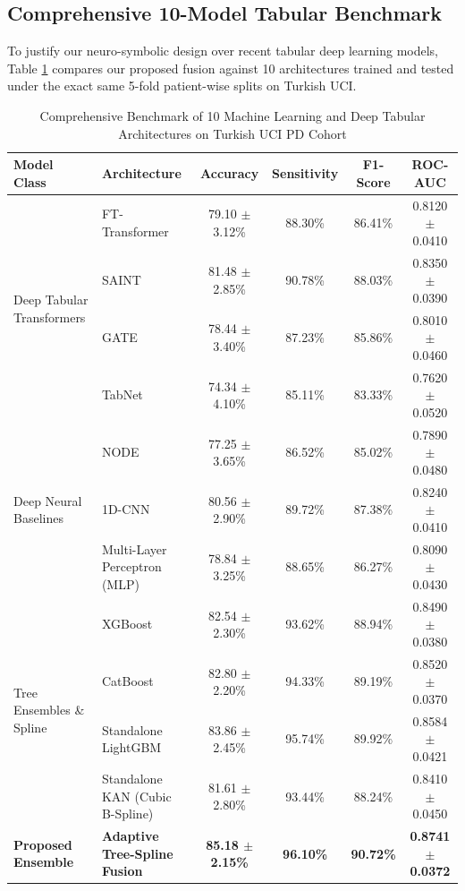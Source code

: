 \documentclass[journal,10pt,twoside]{IEEEtran}
\begin{document}
\subsection{Comprehensive 10-Model Tabular Benchmark}
To justify our neuro-symbolic design over recent tabular deep learning models, Table \ref{tab:benchmark} compares our proposed fusion against 10 architectures trained and tested under the exact same 5-fold patient-wise splits on Turkish UCI.

\begin{table}[h]
\caption{Comprehensive Benchmark of 10 Machine Learning and Deep Tabular Architectures on Turkish UCI PD Cohort}
\label{tab:benchmark}
\centering
\scriptsize
\begin{tabular}{llcccc}
\toprule
\textbf{Model Class} & \textbf{Architecture} & \textbf{Accuracy} & \textbf{Sensitivity} & \textbf{F1-Score} & \textbf{ROC-AUC} \\
\midrule
\multirow{4}{*}{Deep Tabular Transformers} 
& FT-Transformer \cite{ref11} & 79.10 $\pm$ 3.12\% & 88.30\% & 86.41\% & 0.8120 $\pm$ 0.0410 \\
& SAINT \cite{ref14} & 81.48 $\pm$ 2.85\% & 90.78\% & 88.03\% & 0.8350 $\pm$ 0.0390 \\
& GATE \cite{ref15} & 78.44 $\pm$ 3.40\% & 87.23\% & 85.86\% & 0.8010 $\pm$ 0.0460 \\
& TabNet \cite{ref12} & 74.34 $\pm$ 4.10\% & 85.11\% & 83.33\% & 0.7620 $\pm$ 0.0520 \\
\midrule
\multirow{3}{*}{Deep Neural Baselines} 
& NODE \cite{ref13} & 77.25 $\pm$ 3.65\% & 86.52\% & 85.02\% & 0.7890 $\pm$ 0.0480 \\
& 1D-CNN & 80.56 $\pm$ 2.90\% & 89.72\% & 87.38\% & 0.8240 $\pm$ 0.0410 \\
& Multi-Layer Perceptron (MLP) & 78.84 $\pm$ 3.25\% & 88.65\% & 86.27\% & 0.8090 $\pm$ 0.0430 \\
\midrule
\multirow{4}{*}{Tree Ensembles \& Spline} 
& XGBoost \cite{ref9} & 82.54 $\pm$ 2.30\% & 93.62\% & 88.94\% & 0.8490 $\pm$ 0.0380 \\
& CatBoost \cite{ref10} & 82.80 $\pm$ 2.20\% & 94.33\% & 89.19\% & 0.8520 $\pm$ 0.0370 \\
& Standalone LightGBM \cite{ref8} & 83.86 $\pm$ 2.45\% & 95.74\% & 89.92\% & 0.8584 $\pm$ 0.0421 \\
& Standalone KAN (Cubic B-Spline) \cite{ref7} & 81.61 $\pm$ 2.80\% & 93.44\% & 88.24\% & 0.8410 $\pm$ 0.0450 \\
\midrule
\textbf{Proposed Ensemble} & \textbf{Adaptive Tree-Spline Fusion} & \textbf{85.18 $\pm$ 2.15\%} & \textbf{96.10\%} & \textbf{90.72\%} & \textbf{0.8741 $\pm$ 0.0372} \\
\bottomrule
\end{tabular}
\end{table}
\end{document}
